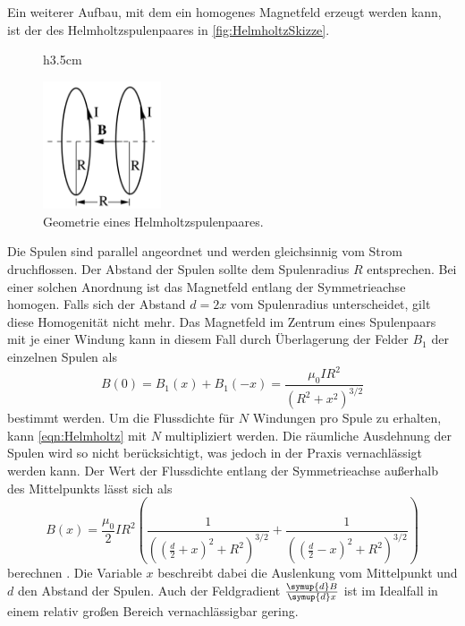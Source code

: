 Ein weiterer Aufbau, mit dem ein homogenes Magnetfeld erzeugt werden kann, ist der des Helmholtzspulenpaares in \autoref{fig:HelmholtzSkizze}.
\begin{figure}{h}{3.5cm}
    \centering
    \caption{Geometrie eines Helmholtzspulenpaares. \cite{v308}}
    \label{fig:HelmholtzSkizze}
    \includegraphics[width=3.5cm]{content/HelmholtzSkizze.jpg}
\end{figure}
Die Spulen sind parallel angeordnet und werden gleichsinnig vom Strom druchflossen. Der Abstand der Spulen sollte dem Spulenradius $R$ entsprechen. Bei einer solchen Anordnung 
ist das Magnetfeld entlang der Symmetrieachse homogen. Falls sich der Abstand $d = 2x$ vom Spulenradius unterscheidet, gilt diese Homogenität nicht mehr. Das Magnetfeld im 
Zentrum eines Spulenpaars mit je einer Windung kann in diesem Fall durch Überlagerung der Felder $B_1$ der einzelnen Spulen als
\begin{equation}
    \label{eqn:Helmholtz}
    B(0) = B_1(x) + B_1(-x) = \frac{\mu_0 I R^2}{(R^2 + x^2)^{3/2}}
\end{equation}
bestimmt werden. Um die Flussdichte für $N$ Windungen pro Spule zu erhalten, kann \autoref{eqn:Helmholtz} mit $N$ multipliziert werden. Die räumliche Ausdehnung
der Spulen wird so nicht berücksichtigt, was jedoch in der Praxis vernachlässigt werden kann. Der Wert der Flussdichte entlang der Symmetrieachse außerhalb des Mittelpunkts lässt sich als
\begin{equation}
    \label{eqn:Helmholtz_theo}
    B(x) = \frac{\mu_0}{2}I R^2 \left(\frac{1}{\left(\left(\frac{d}{2}+x\right)^2 + R^2\right)^{3/2}} + \frac{1}{\left(\left(\frac{d}{2} - x\right)^2 + R^2\right)^{3/2}} \right)
\end{equation}
berechnen \cite{finke92}. Die Variable $x$ beschreibt dabei die Auslenkung vom Mittelpunkt und $d$ den Abstand der Spulen.
Auch der Feldgradient $\frac{\symup{d}B}{\symup{d}x}$ ist im Idealfall in einem relativ großen Bereich vernachlässigbar gering.

